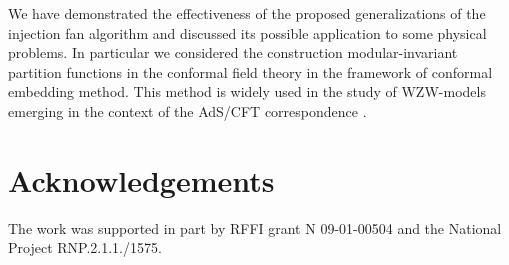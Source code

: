 \documentclass[a4paper,12pt]{article}
\theoremstyle{definition} \newtheorem{Def}{Definition}
\begin{document}
We have demonstrated the effectiveness of the proposed generalizations of the injection fan algorithm and discussed its possible application to some physical problems. In particular we considered the construction modular-invariant partition functions in the conformal field theory in the framework of conformal embedding method. This  method is widely used in the study of WZW-models emerging in the context of the AdS/CFT correspondence \cite{Maldacena:2000hw,Maldacena:2000kv,Maldacena:2001km}.


\section{Acknowledgements}
The work was supported in
part by RFFI grant N 09-01-00504 and the National Project RNP.2.1.1./1575.

{}

\end{document}
